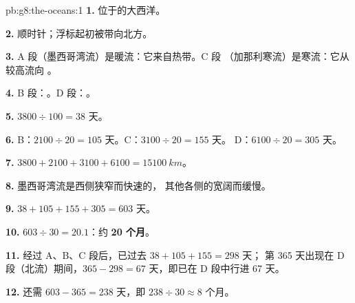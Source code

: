 \begin{solution}{pb:g8:the-oceans:1}
\textbf{1.} 位于的大西洋。

\textbf{2.} 顺时针；浮标起初被带向北方。

\textbf{3.} A 段（墨西哥湾流）是暖流：它来自热带。C 段
（加那利寒流）是寒流：它从较高流向
。

\textbf{4.} B 段：。D 段：。

\textbf{5.} $3800 \div 100 = 38$ 天。

\textbf{6.} B：$2100 \div 20 = 105$ 天。C：$3100 \div 20 = 155$ 天。
D：$6100 \div 20 = 305$ 天。

\textbf{7.} $3800 + 2100 + 3100 + 6100 = \qty{15100}{km}$。

\textbf{8.} 墨西哥湾流是西侧狭窄而快速的，
其他各侧的宽阔而缓慢。

\textbf{9.} $38 + 105 + 155 + 305 = 603$ 天。

\textbf{10.} $603 \div 30 = 20.1$：约 \textbf{20 个月}。

\textbf{11.} 经过 A、B、C 段后，已过去 $38 + 105 + 155 = 298$ 天；
第 365 天出现在 D 段（北流）期间，$365 -
298 = 67$ 天，即已在 D 段中行进 67 天。

\textbf{12.} 还需 $603 - 365 = 238$ 天，即 $238 \div 30 \approx 8$
个月。
\end{solution}
